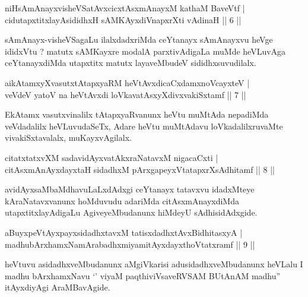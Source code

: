 \begin{shl}
niHsAmAnayxvisheVSatAvxcicxtAsxmAnayxM kathaM BaveVtf |\\
cidutapxtitxlayAsididhxH sAMKAyxdiVnapxrXti vAdinaH \hfill || 6 ||
\end{shl}

\begin{artha}
sAmAnayx-visheVSagaLu ilalxdadxriMda ceYtanayx sAmAnayxvu heVge ididxVtu ? matutx sAMKayxre modalA parxtivAdigaLa muMde heVLuvAga ceYtanayxdiMda utapxtitx matutx layaveMbudeV sididhxsuvudilalx.
\end{artha}

\begin{shl}
aikAtamxyXvasutxtAtapxyaRM heVtAvxdicaCxdamxnoVcayxteV |\\
veVdeV yatoV na heVtAvxdi loVkavatAsxyXdivxvakiSxtamf \hfill || 7 ||
\end{shl}

\begin{artha}
EkAtamx vasutxvinalilx tAtapxyaRvanunx heVtu muMtAda nepadiMda veVdadalilx heVLuvudaSeTx, Adare heVtu muMtAdavu loVkadalilxruvaMte vivakiSxtavalalx, muKayxvAgilalx.
\end{artha}

\begin{shl}
citatxtatxvXM sadavidAyxvatAkxraNatavxM nigacaCxti |\\
citAsxmAnAyxdayxtaH sidadhxM pArxgapeyxVtatapxrXsAdhitamf \hfill || 8 ||
\end{shl}

\begin{artha}
avidAyxsaMbaMdhavuLaLxdAdxgi ceYtanayx tatavxvu idadxMteye kAraNatavxvanunx hoMdu\-vudu adariMda citAsxmAnayxdiMda utapxtitxlayAdigaLu AgiveyeMbudanunx hiMdeyU sAdhisidAdxgide.
\end{artha}


\begin{shl}
aBuyxpeVtAyxpayxsidadhxtavxM tatisxdadhxtAvxBidhitasxyA |\\
madhubArxhamxNamArabadhxmiyamitAyxdayxthoVtatxramf \hfill || 9 ||
\end{shl}

\begin{artha}
heVtuvu asidadhxveMbudanunx aMgiVkarisi adusidadhxveMbudanunx heVLalu I madhu bArxhamxNavu `' viyaM paqthiviVsaveRVSAM BUtAnAM madhu'' itAyxdiyAgi AraMBavAgide.
\end{artha}

